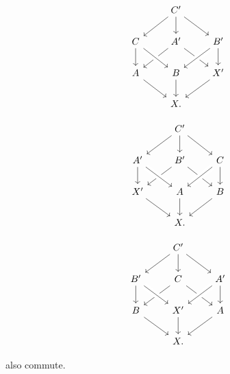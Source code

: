 \begin{lem}
\begin{center}
  \begin{minipage}{.3\textwidth}
  \begin{equation*}
    \begin{tikzcd}
      & C' \arrow[dl] \arrow[d] \arrow[dr] \\
      C \arrow[d] & A' \arrow[dl] \arrow[dr] & B' \arrow[dl,crossing over] \arrow[d] \\
      A \arrow[dr] & B \arrow[from=ul,crossing over] \arrow[d] & X' \arrow[dl] \\
      & X.
    \end{tikzcd}
  \end{equation*}
  \end{minipage}
  \begin{minipage}{.3\textwidth}
  \begin{equation*}
    \begin{tikzcd}
      & C' \arrow[dl] \arrow[d] \arrow[dr] \\
      A' \arrow[d] & B' \arrow[dl] \arrow[dr] & C \arrow[dl,crossing over] \arrow[d] \\
      X' \arrow[dr] & A \arrow[from=ul,crossing over] \arrow[d] & B \arrow[dl] \\
      & X.
    \end{tikzcd}
  \end{equation*}
  \end{minipage}
  \begin{minipage}{.3\textwidth}
  \begin{equation*}
    \begin{tikzcd}
      & C' \arrow[dl] \arrow[d] \arrow[dr] \\
      B' \arrow[d] & C \arrow[dl] \arrow[dr] & A' \arrow[dl,crossing over] \arrow[d] \\
      B \arrow[dr] & X' \arrow[from=ul,crossing over] \arrow[d] & A \arrow[dl] \\
      & X.
    \end{tikzcd}
  \end{equation*}
  \end{minipage}
  \end{center}
  also commute.
\end{lem}

